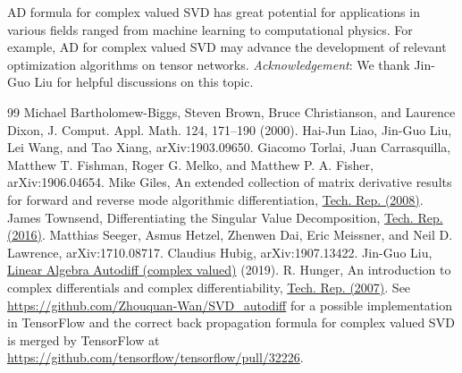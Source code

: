 \documentclass[aps,prl,singlecolumn,preprintnumbers,amsmath,amssymb,notitlepage]{revtex4-1}
\newcommand{\<}{\langle}
\renewcommand{\>}{\rangle}
\newcommand{\p}{\partial}
\begin{document}

AD formula for complex valued SVD has great potential for applications in various fields ranged from machine learning to computational physics. For example, AD for complex valued SVD may advance the development of relevant optimization algorithms on tensor networks\cite{Liao2019}.
\newline
\newline
{\it Acknowledgement}: 
We thank Jin-Guo Liu for helpful discussions on this topic.


\begin{thebibliography}{99}
	 Michael Bartholomew-Biggs, Steven Brown, Bruce Christianson, and Laurence Dixon, J. Comput. Appl. Math. 124, 171–190 (2000). %
	 Hai-Jun Liao, Jin-Guo Liu, Lei Wang, and Tao Xiang, arXiv:1903.09650.
	 Giacomo Torlai, Juan Carrasquilla, Matthew T. Fishman, Roger G. Melko, and Matthew P. A. Fisher, arXiv:1906.04654.
	 Mike Giles, An extended collection of matrix derivative results for forward and reverse mode algorithmic differentiation,
	\href{https://people.maths.ox.ac.uk/gilesm/files/NA-08-01.pdf}{Tech. Rep. (2008)}.
	 James Townsend, Differentiating the Singular Value Decomposition, \href{https://j-towns.github.io/papers/svd-derivative.pdf}{Tech. Rep. (2016)}.
	 Matthias Seeger, Asmus Hetzel, Zhenwen Dai, Eric Meissner,
	and Neil D. Lawrence,  arXiv:1710.08717. %
	 Claudius Hubig, arXiv:1907.13422.
	 Jin-Guo Liu, \href{https://giggleliu.github.io/2019/04/02/einsumbp.html}{Linear Algebra Autodiff (complex valued)} (2019). 
	 R. Hunger, An introduction to complex differentials and complex differentiability,
	\href{https://mediatum.ub.tum.de/doc/631019/631019.pdf}{Tech. Rep. (2007)}.
	 See \url{https://github.com/Zhouquan-Wan/SVD_autodiff} for a possible implementation in TensorFlow and the correct back propagation formula for complex valued SVD is merged by TensorFlow at \url{https://github.com/tensorflow/tensorflow/pull/32226}.
\end{thebibliography}
\end{document}
